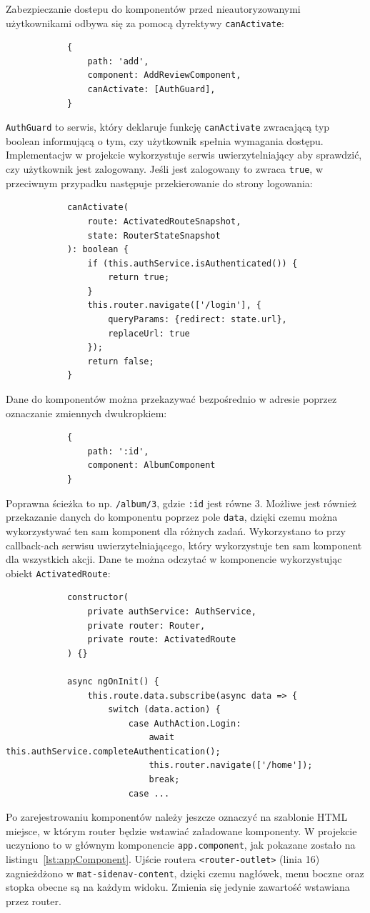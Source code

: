 		Zabezpieczanie dostepu do komponentów przed nieautoryzowanymi użytkownikami odbywa się za pomocą dyrektywy \verb|canActivate|:
		\begin{lstlisting}
			{
				path: 'add',
				component: AddReviewComponent,
				canActivate: [AuthGuard],
			}
		\end{lstlisting}
		\verb|AuthGuard| to serwis, który deklaruje funkcję \verb|canActivate| zwracającą typ boolean informującą o tym, czy użytkownik spełnia wymagania dostępu.
		Implementacjw w projekcie wykorzystuje serwis uwierzytelniający aby sprawdzić, czy użytkownik jest zalogowany.
		Jeśli jest zalogowany to zwraca \verb|true|, w przeciwnym przypadku następuje przekierowanie do strony logowania:
		\begin{lstlisting}
			canActivate(
				route: ActivatedRouteSnapshot,
				state: RouterStateSnapshot
			): boolean {
				if (this.authService.isAuthenticated()) {
					return true;
				}
				this.router.navigate(['/login'], {
					queryParams: {redirect: state.url},
					replaceUrl: true
				});
				return false;
			}
		\end{lstlisting}

		Dane do komponentów można przekazywać bezpośrednio w adresie poprzez oznaczanie zmiennych dwukropkiem:
		\begin{lstlisting}
			{
				path: ':id',
				component: AlbumComponent
			}
		\end{lstlisting}
		Poprawna ścieżka to np. \verb|/album/3|, gdzie \verb|:id| jest równe 3.
		Możliwe jest również przekazanie danych do komponentu poprzez pole \verb|data|, dzięki czemu można wykorzystywać ten sam komponent dla różnych zadań.
		Wykorzystano to przy callback-ach serwisu uwierzytelniającego, który wykorzystuje ten sam komponent dla wszystkich akcji.
		Dane te można odczytać w komponencie wykorzystując obiekt \verb|ActivatedRoute|:
		\begin{lstlisting}
			constructor(
				private authService: AuthService,
				private router: Router,
				private route: ActivatedRoute
			) {}
		
			async ngOnInit() {
				this.route.data.subscribe(async data => {
					switch (data.action) {
						case AuthAction.Login:
							await this.authService.completeAuthentication();
							this.router.navigate(['/home']);
							break;
						case ...
		\end{lstlisting}

		Po zarejestrowaniu komponentów należy jeszcze oznaczyć na szablonie HTML miejsce, w którym router będzie wstawiać załadowane komponenty.
		W projekcie uczyniono to w głównym komponencie \verb|app.component|, jak pokazane zostało na listingu~\ref{lst:appComponent}.
		Ujście routera \verb|<router-outlet>| (linia 16) zagnieżdżono w \verb|mat-sidenav-content|,
		dzięki czemu nagłówek, menu boczne oraz stopka obecne są na każdym widoku.
		Zmienia się jedynie zawartość wstawiana przez router.

